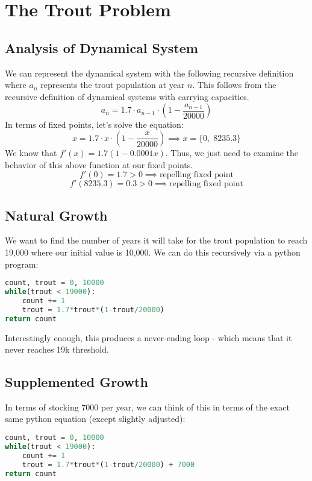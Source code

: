 
\section{The Trout Problem}
\subsection{Analysis of Dynamical System}
We can represent the dynamical system with the following recursive definition where $a_n$ represents the trout population at year $n$. This follows from the recursive definition of dynamical systems with carrying capacities.
$$
a_n  = 1.7 \cdot a_{n-1} \cdot (1-\frac{a_{n -1}}{20000})
$$
In terms of fixed points, let's solve the equation:
$$
x = 1.7 \cdot x \cdot (1-\frac{x}{20000}) \implies x = \{0,\;8235.3\}
$$
We know that $f'(x) = 1.7\left(1-0.0001x\right)$. Thus, we just need to examine the behavior of this above function at our fixed points.
$$
f'(0) = 1.7 > 0 \implies \text{repelling fixed point}
$$
$$
f'(8235.3) = 0.3 > 0 \implies \text{repelling fixed point}
$$
\subsection{Natural Growth}
We want to find the number of years it will take for the trout population to reach 19,000 where our initial value is 10,000. We can do this recursively via a python program:
\begin{lstlisting}[language=Python]
count, trout = 0, 10000
while(trout < 19000):
    count += 1
    trout = 1.7*trout*(1-trout/20000)
return count
\end{lstlisting}
Interestingly enough, this produces a never-ending loop - which means that it never reaches 19k threshold.
\subsection{Supplemented Growth}
In terms of stocking $7000$ per year, we can think of this in terms of the exact same python equation (except slightly adjusted):
\begin{lstlisting}[language=Python]
count, trout = 0, 10000
while(trout < 19000):
    count += 1
    trout = 1.7*trout*(1-trout/20000) + 7000
return count
\end{lstlisting}

